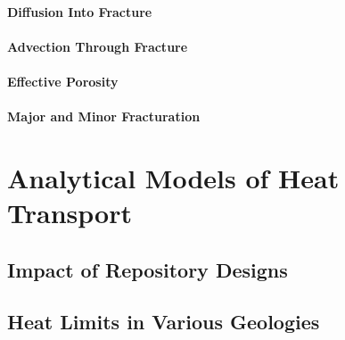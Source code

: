 % 
%  
% 




\paragraph{Diffusion Into Fracture}

\paragraph{Advection Through Fracture}

\paragraph{Effective Porosity}

\paragraph{Major and Minor Fracturation}











\section{Analytical Models of Heat 
Transport}\label{sec:analytical_heat}

\subsection{Impact of Repository Designs}

\subsection{Heat Limits in Various Geologies}

